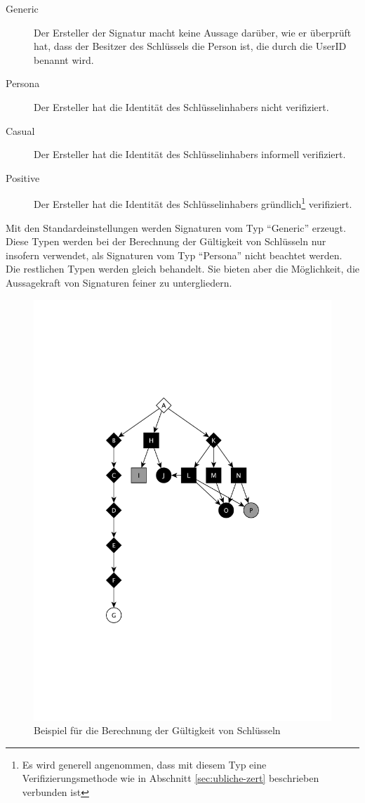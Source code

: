 \begin{description}
\item[Generic] Der Ersteller der Signatur macht keine Aussage
  darüber, wie er überprüft hat, dass der Besitzer des
  Schlüssels die Person ist, die durch die UserID benannt wird.
\item[Persona] Der Ersteller hat die Identität des
  Schlüsselinhabers nicht verifiziert.
\item[Casual] Der Ersteller hat die Identität des
  Schlüsselinhabers informell verifiziert.
\item[Positive] Der Ersteller hat die Identität des
  Schlüsselinhabers gründlich\footnote{Es wird generell
    angenommen, dass mit diesem Typ eine Verifizierungsmethode wie in
    Abschnitt \ref{sec:ubliche-zert} beschrieben verbunden ist}
  verifiziert.
\end{description}

Mit den Standardeinstellungen werden Signaturen vom Typ ``Generic''
erzeugt. Diese Typen werden bei der Berechnung der Gültigkeit von
Schlüsseln nur insofern verwendet, als Signaturen vom Typ
``Persona'' nicht beachtet werden. Die restlichen Typen werden gleich
behandelt. Sie bieten aber die Möglichkeit, die Aussagekraft von
Signaturen feiner zu untergliedern.

\begin{figure}[t]
  \centering
  \includegraphics[scale=0.7]{images/trust-beispiel.pdf}
  \caption{Beispiel für die Berechnung der Gültigkeit von Schlüsseln}
  \label{fig:trust-beispiel}
\end{figure}

